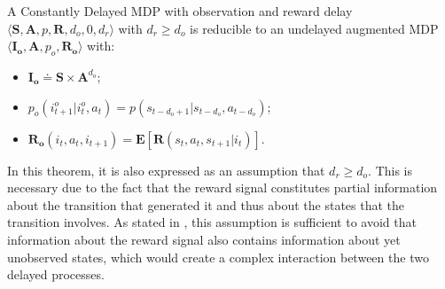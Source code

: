                 \begin{theorem}
                    \label{th:dmdpobsred_v1}
                    A Constantly Delayed MDP with observation and reward delay $\langle \mathbf{S}, \mathbf{A}, p, \mathbf{R}, d_o, 0, d_r \rangle$ with $d_r \geq d_o$ is reducible to an undelayed augmented MDP $\langle \mathbf{I_o}, \mathbf{A}, p_o, \mathbf{R_o} \rangle$ with: 
                    \begin{itemize}[topsep=0.5em, partopsep=0.5em]
                        \setlength\itemsep{0em}
                        \item $\mathbf{I_{o}} \doteq \mathbf{S} \times \mathbf{A}^{d_o}$;
                        \item $p_o \left( i_{t+1}^o | i_t^o , a_t  \right) = p ( s_{t-d_{o}+1} | s_{t-d_{o}}, a_{t-d_{o}})$;
                        \item $\mathbf{R_{o}}\left( i_t, a_{t}, i_{t+1} \right) = \mathbf{E} \left[ \mathbf{R} \left( s_t, a_t, s_{t+1} | i_t \right) \right]$.
                    \end{itemize}
                \end{theorem}
                
                In this theorem, it is also expressed as an assumption that $d_r \geq d_o$. This is necessary due to the fact that the reward signal constitutes partial information about the transition that generated it and thus about the states that the transition involves. As stated in , this assumption is sufficient to avoid that information about the reward signal also contains information about yet unobserved states, which would create a complex interaction between the two delayed processes.
                
